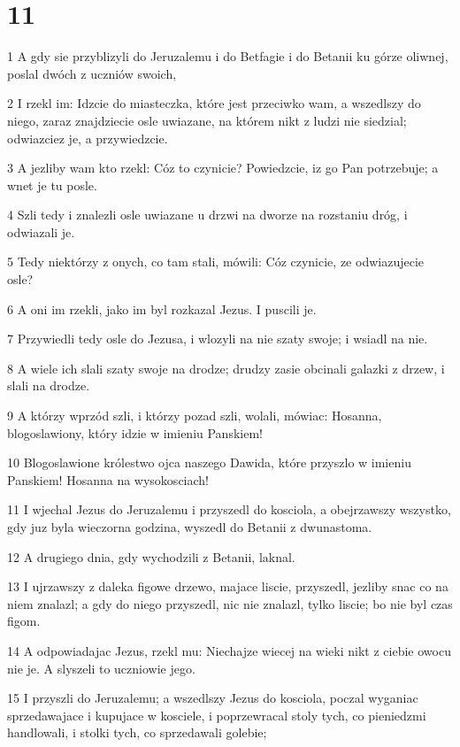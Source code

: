 \chapter{11}

\par 1 A gdy sie przyblizyli do Jeruzalemu i do Betfagie i do Betanii ku górze oliwnej, poslal dwóch z uczniów swoich,
\par 2 I rzekl im: Idzcie do miasteczka, które jest przeciwko wam, a wszedlszy do niego, zaraz znajdziecie osle uwiazane, na którem nikt z ludzi nie siedzial; odwiazciez je, a przywiedzcie.
\par 3 A jezliby wam kto rzekl: Cóz to czynicie? Powiedzcie, iz go Pan potrzebuje; a wnet je tu posle.
\par 4 Szli tedy i znalezli osle uwiazane u drzwi na dworze na rozstaniu dróg, i odwiazali je.
\par 5 Tedy niektórzy z onych, co tam stali, mówili: Cóz czynicie, ze odwiazujecie osle?
\par 6 A oni im rzekli, jako im byl rozkazal Jezus. I puscili je.
\par 7 Przywiedli tedy osle do Jezusa, i wlozyli na nie szaty swoje; i wsiadl na nie.
\par 8 A wiele ich slali szaty swoje na drodze; drudzy zasie obcinali galazki z drzew, i slali na drodze.
\par 9 A którzy wprzód szli, i którzy pozad szli, wolali, mówiac: Hosanna, blogoslawiony, który idzie w imieniu Panskiem!
\par 10 Blogoslawione królestwo ojca naszego Dawida, które przyszlo w imieniu Panskiem! Hosanna na wysokosciach!
\par 11 I wjechal Jezus do Jeruzalemu i przyszedl do kosciola, a obejrzawszy wszystko, gdy juz byla wieczorna godzina, wyszedl do Betanii z dwunastoma.
\par 12 A drugiego dnia, gdy wychodzili z Betanii, laknal.
\par 13 I ujrzawszy z daleka figowe drzewo, majace liscie, przyszedl, jezliby snac co na niem znalazl; a gdy do niego przyszedl, nic nie znalazl, tylko liscie; bo nie byl czas figom.
\par 14 A odpowiadajac Jezus, rzekl mu: Niechajze wiecej na wieki nikt z ciebie owocu nie je. A slyszeli to uczniowie jego.
\par 15 I przyszli do Jeruzalemu; a wszedlszy Jezus do kosciola, poczal wyganiac sprzedawajace i kupujace w kosciele, i poprzewracal stoly tych, co pieniedzmi handlowali, i stolki tych, co sprzedawali golebie;
